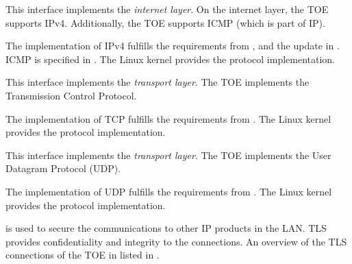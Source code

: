 
This interface implements the \emph{internet layer}. On the internet layer, the
TOE supports IPv4. Additionally, the TOE supports ICMP (which is part of IP).



The implementation of IPv4 fulfills the requirements from ,
 and the update in . ICMP is specified in
. The Linux kernel provides the protocol implementation.






This interface implements the \emph{transport layer}. The TOE implements the
Transmission Control Protocol.



The implementation of TCP fulfills the requirements from . The Linux
kernel provides the protocol implementation.






This interface implements the \emph{transport layer}. The TOE implements the
User Datagram Protocol (UDP).



The implementation of UDP fulfills the requirements from . The Linux
kernel provides the protocol implementation.





\lslantls{} is used to secure the communications to other IP products in the
LAN. TLS provides confidentiality and integrity to the connections. An overview
of the TLS connections of the TOE in listed in .

